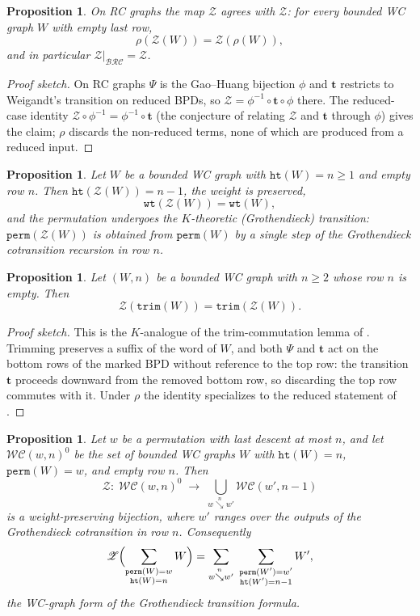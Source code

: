 \documentclass{amsart}
\newtheorem{proposition}[lemma]{Proposition}
\theoremstyle{definition}
\theoremstyle{remark}
\numberwithin{equation}{subsection}
\newcommand{\downvar}[1]{\stackrel{#1}{\searrow}}
\newcommand{\wof}[1]{\mathtt{perm}(#1)}
\newcommand{\wtt}{\mathtt{wt}}
\newcommand{\trm}{\mathtt{trim}}
\newcommand{\zeromap}{\mathcal{Z}}
\newcommand{\hr}{\mathtt{ht}}
\newcommand{\BRC}{\mathcal{BRC}}
\newcommand{\WC}{\mathcal{WC}}
\newcommand{\lzeromap}{\mathscr{Z}}
\begin{document}
\begin{proposition}\label{proposition:lzero-reduces}
On RC graphs the map $\lzeromap$ agrees with $\zeromap$: for every bounded WC
graph $W$ with empty last row,
$$\rho(\lzeromap(W))=\zeromap(\rho(W)),$$
and in particular $\lzeromap|_{\BRC}=\zeromap$.
\end{proposition}
\begin{proof}[Proof sketch]
On RC graphs $\Psi$ is the Gao--Huang bijection $\phi$ and $\mathbf{t}$
restricts to Weigandt's transition on reduced BPDs, so
$\lzeromap=\phi^{-1}\circ\mathbf{t}\circ\phi$ there. The reduced-case identity
$\zeromap\circ\phi^{-1}=\phi^{-1}\circ\mathbf{t}$
(the conjecture of \cite{samuelmolev} relating $\zeromap$ and $\mathbf{t}$
through $\phi$) gives the claim; $\rho$ discards the non-reduced terms, none of
which are produced from a reduced input.
\end{proof}

\begin{proposition}\label{proposition:lzero-transition}
Let $W$ be a bounded WC graph with $\hr(W)=n\geq 1$ and empty row $n$. Then
$\hr(\lzeromap(W))=n-1$, the weight is preserved,
$$\wtt(\lzeromap(W))=\wtt(W),$$
and the permutation undergoes the $K$-theoretic (Grothendieck) transition:
$\wof{\lzeromap(W)}$ is obtained from $\wof{W}$ by a single step of the
Grothendieck cotransition recursion in row $n$.
\end{proposition}

\begin{proposition}\label{proposition:lztrim}
Let $(W,n)$ be a bounded WC graph with $n\geq 2$ whose row $n$ is empty. Then
$$\lzeromap(\trm(W))=\trm(\lzeromap(W)).$$
\end{proposition}
\begin{proof}[Proof sketch]
This is the $K$-analogue of the trim-commutation lemma of \cite{samuelmolev}.
Trimming preserves a suffix of the word of $W$, and both $\Psi$ and $\mathbf{t}$
act on the bottom rows of the marked BPD without reference to the top row: the
transition $\mathbf{t}$ proceeds downward from the removed bottom row, so
discarding the top row commutes with it. Under $\rho$ the identity specializes
to the reduced statement of \cite{samuelmolev}.
\end{proof}

\begin{proposition}\label{proposition:lzero-bijection}
Let $w$ be a permutation with last descent at most $n$, and let
$\WC(w,n)^0$ be the set of bounded WC graphs $W$ with $\hr(W)=n$, $\wof{W}=w$,
and empty row $n$. Then
$$\lzeromap:\;\WC(w,n)^{0}\;\longrightarrow\;\bigcup_{w\downvar{n} w'}\WC(w',n-1)$$
is a weight-preserving bijection, where $w'$ ranges over the outputs of the
Grothendieck cotransition in row $n$. Consequently
$$\lzeromap\Bigl(\sum_{\substack{\wof{W}=w\\\hr(W)=n}}W\Bigr)=\sum_{w\downvar{n} w'}\ \sum_{\substack{\wof{W'}=w'\\\hr(W')=n-1}}W',$$
the WC-graph form of the Grothendieck transition formula.
\end{proposition}
\end{document}
